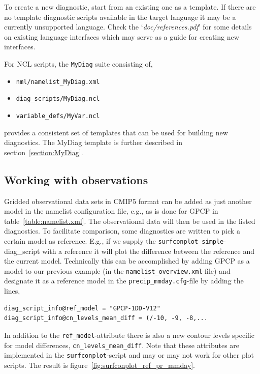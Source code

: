 \documentclass[12pt]{article}
\newcommand{\docref}[1]{`\emph{#1}'}
\begin{document}
To create a new diagnostic, start from an existing one as a
template. If there are no template diagnostic scripts available in the
target language it may be a currently unsupported language. Check the
\docref{doc/references.pdf} for some details on existing language
interfaces which may serve as a guide for creating new interfaces.

For NCL scripts, the \texttt{MyDiag} suite consisting of,
\begin{itemize}
\item \texttt{nml/namelist\_MyDiag.xml}
\item \texttt{diag\_scripts/MyDiag.ncl}
\item \texttt{variable\_defs/MyVar.ncl}
\end{itemize}
provides a consistent set of templates that can be used for building
new diagnostics. The MyDiag template is further described in
section~\ref{section:MyDiag}.

\subsection{Working with observations}\label{subsection:observations}
Gridded observational data sets in CMIP5 format can be added as just
another model in the namelist configuration file, e.g., as is done for
GPCP in table~\ref{table:namelist.xml}. The observational data will
then be used in the listed diagnostics. To facilitate comparison, some
diagnostics are written to pick a certain model as reference. E.g., if
we supply the \texttt{surfconplot\_simple}-diag\_script with a reference
it will plot the difference between the reference and the current
model. Technically this can be accomplished by adding GPCP as a model
to our previous example (in the \texttt{namelist\_overview.xml}-file)
and designate it as a reference model in the
\texttt{precip\_mmday.cfg}-file by adding the lines,  
\begin{Verbatim}[frame=single, fontsize=\footnotesize]
diag_script_info@ref_model = "GPCP-1DD-V12"
diag_script_info@cn_levels_mean_diff = (/-10, -9, -8,...
\end{Verbatim}
In addition to the \texttt{ref\_model}-attribute there is also a new
contour levels specific for model differences,
\texttt{cn\_levels\_mean\_diff}. Note that these attributes are
implemented in the \texttt{surfconplot}-script and may or may not work
for other plot scripts. The result is
figure~\ref{fig:surfconplot_ref_pr_mmday}. 
\end{document}
